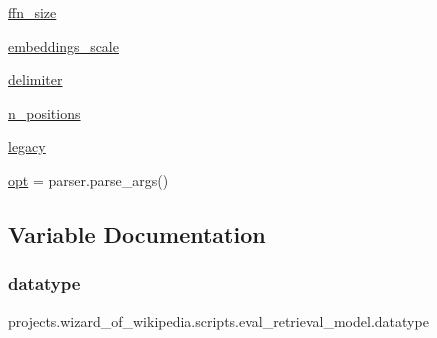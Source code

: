 \begin{DoxyCompactItemize}
\item 
\hyperlink{namespaceprojects_1_1wizard__of__wikipedia_1_1scripts_1_1eval__retrieval__model_a2cdabe9f6dda7b5d9606dc19374f5e49}{ffn\+\_\+size}
\item 
\hyperlink{namespaceprojects_1_1wizard__of__wikipedia_1_1scripts_1_1eval__retrieval__model_aaa2110a0cf4be378a72075c77dcc4ffb}{embeddings\+\_\+scale}
\item 
\hyperlink{namespaceprojects_1_1wizard__of__wikipedia_1_1scripts_1_1eval__retrieval__model_a4aca7abfbfd4c622aac44526dd789275}{delimiter}
\item 
\hyperlink{namespaceprojects_1_1wizard__of__wikipedia_1_1scripts_1_1eval__retrieval__model_a7ea239853a43f5bc17fbdf4261d8e257}{n\+\_\+positions}
\item 
\hyperlink{namespaceprojects_1_1wizard__of__wikipedia_1_1scripts_1_1eval__retrieval__model_a292c04036a96e6cb76f754d10dc6a079}{legacy}
\item 
\hyperlink{namespaceprojects_1_1wizard__of__wikipedia_1_1scripts_1_1eval__retrieval__model_a0fd806aeed2d843619bbfd4f6ab1fa27}{opt} = parser.\+parse\+\_\+args()
\end{DoxyCompactItemize}


\subsection{Variable Documentation}
\mbox{\label{namespaceprojects_1_1wizard__of__wikipedia_1_1scripts_1_1eval__retrieval__model_ad045cf4630e369b52c99c73b080f7bbf}} 
\subsubsection{\texorpdfstring{datatype}{datatype}}
{\footnotesize\ttfamily projects.\+wizard\+\_\+of\+\_\+wikipedia.\+scripts.\+eval\+\_\+retrieval\+\_\+model.\+datatype}

\mbox{\label{namespaceprojects_1_1wizard__of__wikipedia_1_1scripts_1_1eval__retrieval__model_a990de8456f40c15f5adae005e1791e0e}} 
